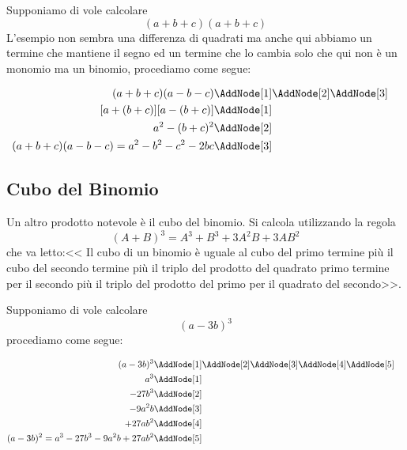 \begin{esempio}
Supponiamo di vole calcolare \[(a+b+c)(a+b+c)\]
L'esempio non sembra una differenza di quadrati ma anche qui abbiamo un termine che mantiene il segno ed un termine che lo cambia solo che qui non è un monomio ma un binomio, procediamo come segue:
\begin{NodesList}
	\begin{align*}
		(a+b+c)(a-b-c)&\AddNode[1]\AddNode[2]\AddNode[3]\\
		[a+(b+c)][a-(b+c)]&\AddNode[1]&\\ 
		a^2-(b+c)^2&\AddNode[2]&\\
		(a+b+c)(a-b-c)=a^2-b^2-c^2-2bc&\AddNode[3]
	\end{align*}
\end{NodesList}
\end{esempio}
\subsection{Cubo del Binomio}
Un altro prodotto notevole è il cubo del binomio. Si calcola utilizzando la regola\[(A+B)^3=A^3+B^3+3A^2B+3AB^2\] che va letto:<< Il cubo di un binomio è uguale al cubo del primo termine più il cubo del secondo termine più il triplo del prodotto del quadrato primo termine per il secondo  più il triplo del prodotto del primo per il quadrato del secondo>>. 
\begin{center}

\end{center}
\begin{esempio}
Supponiamo di vole calcolare \[(a-3b)^3\]
procediamo come segue:
\begin{NodesList}
	\begin{align*}
		(a-3b)^3&\AddNode[1]\AddNode[2]\AddNode[3]\AddNode[4]\AddNode[5]\\
		a^3&\AddNode[1]&\\ 
		-27b^3&\AddNode[2]&\\
		-9a^2b&\AddNode[3]\\
		+27ab^2&\AddNode[4]\\
		(a-3b)^2=a^3-27b^3-9a^2b+27ab^2&\AddNode[5]
	\end{align*}
\end{NodesList}
\end{esempio}

